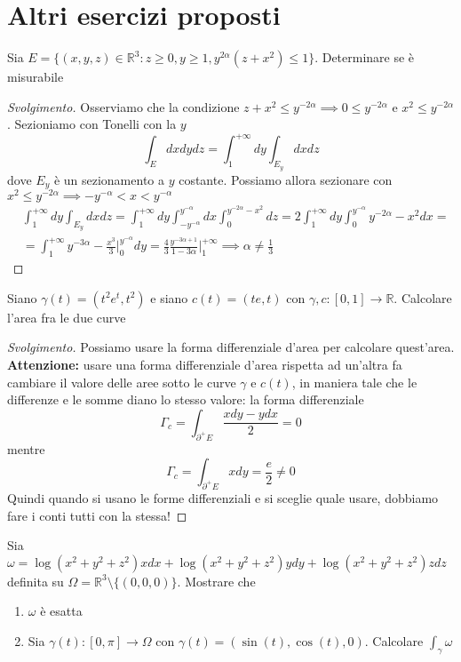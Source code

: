 \chapter{Altri esercizi proposti}
\pagestyle{plain}
\thispagestyle{empty}
\pagestyle{fancy}
\begin{exercise}
	Sia $E=\{(x, y, z) \in \mathbb{R}^3 : z \geq 0, y \geq 1, y^{2 \alpha}(z + x^2) \leq 1 \}$. Determinare se è misurabile
\end{exercise}
\begin{proof}[Svolgimento]
	Osserviamo che la condizione $z + x^2 \leq y^{-2 \alpha} \implies 0 \leq y^{-2\alpha}$ e $x^2 \leq y^{-2 \alpha}$. Sezioniamo con Tonelli con la $y$
	$$
	\int_E dxdydz = \int_1^{+\infty} dy \int_{E_y} dxdz
	$$
	dove $E_y$ è un sezionamento a $y$ costante. Possiamo allora sezionare con $x^2 \leq y^{-2\alpha} \implies -y^{-\alpha} < x < y^{-\alpha}$
	\begin{align*}
	&\int_1^{+\infty} dy \int_{E_y} dxdz = \int_1^{+\infty} dy \int_{-y^{-\alpha}}^{y^{-\alpha}} dx \int_0^{y^{-2 \alpha} - x^2} dz = 2 \int_1^{+\infty} dy \int_0^{y^{-\alpha}} y^{-2 \alpha} - x^2 dx = \\
	&=\int_1^{+\infty} y^{-3 \alpha} - \frac{x^3}{3}\Bigg|_0^{y^{-\alpha}} dy = \frac{4}{3} \frac{y^{-3\alpha + 1}}{1 - 3 \alpha}\Bigg|_1^{+\infty} \implies \alpha \neq \frac{1}{3}
	\end{align*}
\end{proof}
\begin{exercise}
Siano $\gamma(t)=(t^2 e^t, t^2)$ e siano $c(t)=(te, t)$ con $\gamma, c:[0,1] \to \mathbb{R}$. Calcolare l'area fra le due curve
\end{exercise}
\begin{proof}[Svolgimento]
	Possiamo usare la forma differenziale d'area per calcolare quest'area. \textbf{Attenzione:} usare una forma differenziale d'area rispetta ad un'altra fa cambiare il valore delle aree sotto le curve $\gamma$ e $c(t)$, in maniera tale che le differenze e le somme diano lo stesso valore: la forma differenziale
	$$
	\Gamma_c = \int_{\partial^{+} E} \frac{xdy - ydx}{2} = 0
	$$
	mentre
	$$
	\Gamma_c = \int_{\partial^{+} E} xdy = \frac{e}{2} \neq 0
	$$
	Quindi quando si usano le forme differenziali e si sceglie quale usare, dobbiamo fare i conti tutti con la stessa!
\end{proof}
\begin{exercise}
	Sia $\omega = \log(x^2 + y^2 + z^2)xdx + \log(x^2+y^2+z^2)ydy + \log(x^2+y^2+z^2)zdz$ definita su $\Omega = \mathbb{R}^3 \setminus \{(0, 0, 0)\}$. Mostrare che 
	\begin{enumerate}
		\item $\omega$ è esatta
		\item Sia $\gamma(t) : [0, \pi] \to \Omega$ con $\gamma(t) = (\sin(t), \cos(t), 0)$. Calcolare $\int_{\gamma} \omega$
	\end{enumerate}
\end{exercise}
